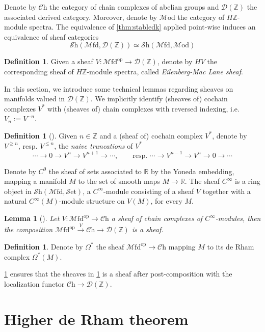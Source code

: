 \documentclass[a4paper]{book}
\newcommand{\lC}{\mathcal{C}}
\newcommand{\lD}{\mathcal{D}}
\newcommand{\lM}{\mathcal{M}}
\newcommand{\bR}{\mathbb{R}}
\newcommand{\lS}{\mathcal{S}}
\newcommand{\bZ}{\mathbb{Z}}
\newcommand{\op}{\mathrm{op}}
\newcommand{\set}{\lS\mathrm{et}} %
\newcommand{\Shv}{\lS\mathrm{h}} %
\newcommand{\Ch}{\lC\mathrm{h}} %
\newcommand{\Mfd}{\lM\mathrm{fd}} %
\newcommand{\Mod}{\lM\mathrm{od}} %
\newtheorem{lemma}[equation]{Lemma}
\theoremstyle{definition}
\newtheorem{definition}[equation]{Definition}
\theoremstyle{remark}
\numberwithin{equation}{section}
\begin{document}
Denote by $\Ch$ the category of chain complexes of abelian groups and $\lD(\bZ)$ the associated derived category. Moreover, denote by $\Mod$ the category of $H\bZ$-module spectra. The equivalence of \cref{thm:stabledk} applied point-wise induces an equivalence of sheaf categories
\[\Shv(\Mfd,\lD(\bZ))\simeq\Shv(\Mfd,\Mod)\] 
\begin{definition}\label{def:EMsheaf}
  Given a sheaf $V:\Mfd^{\op}\to\lD(\bZ)$, denote by $HV$ the corresponding sheaf of $H\bZ$-module spectra, called \emph{Eilenberg-Mac Lane sheaf}. 
\end{definition}
In this section, we introduce some technical lemmas regarding sheaves on manifolds valued in $\lD(\bZ)$. We implicitly identify (sheaves of) cochain complexes $V^*$ with (sheaves of) chain complexes with reversed indexing, i.e. $V_n:=V^{-n}$.
\begin{definition}[{\cite[Definition 7.14]{bunkenikolausvoelkl2016diffcoh}}]Given $n\in\bZ$ and a (sheaf of) cochain complex $V^*$, denote by $V^{\geq n}$, resp. $V^{\leq n}$, the \emph{naive truncations} of $V^*$ \[\cdots\to0\to V^n\to V^{n+1}\to\cdots, \qquad \mbox{resp. }\cdots\to V^{n-1}\to V^n\to0\to\cdots\]
\end{definition}
Denote by $C^0$ the sheaf of {sets} associated to $\bR$ by the Yoneda embedding, mapping a manifold $M$ to the set of smooth maps $M\to\bR$. The sheaf $C^\infty$ is a ring object in $\Shv(\Mfd,\set)$, a $C^\infty$-module consisting of a sheaf $V$ together with a natural $C^\infty(M)$-module structure on $V(M)$, for every $M$.
\begin{lemma}[{\cite[Lemma 7.12]{bunkenikolausvoelkl2016diffcoh}}]\label{lem:sheafloc}
  Let $V:\Mfd^{\op}\to\Ch$ a sheaf of chain complexes of $C^\infty$-modules, then the composition $\Mfd^{\op}\xrightarrow{V}\Ch\to\lD(\bZ)$ is a sheaf. 
\end{lemma}
\begin{definition}\label{def:forms}
  Denote by $\Omega^*$ the sheaf $\Mfd^{\op}\to\Ch$ mapping $M$ to its de Rham complex $\Omega^*(M)$. 
\end{definition}
\cref{lem:sheafloc} ensures that the sheaves in \cref{def:forms} is a sheaf after post-composition with the localization functor $\Ch\to\lD(\bZ)$. 

\section{Higher de Rham theorem}
\end{document}
